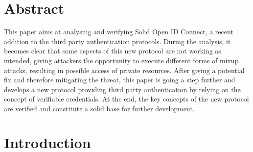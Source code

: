 \documentclass[11pt,twoside,a4paper,openright]{book}
\begin{document}
\frontmatter




\chapter*{Abstract}

This paper aims at analysing and verifying Solid Open ID Connect, a recent addition to the third party authentication protocols. During the analysis, it becomes clear that some aspects of this new protocol are not working as intended, giving attackers the opportunity to execute different forms of mixup attacks, resulting in possible access of private resources. After giving a potential fix and therefore mitigating the threat, this paper is going a step further and develops a new protocol providing third party authentication by relying on the concept of verifiable credentials. At the end, the key concepts of the new protocol are verified and constitute a solid base for further development.

\newpage


\tableofcontents
\newpage


\listoffigures
\newpage


\mainmatter


\chapter{Introduction} 
\label{introduction}
\end{document}
